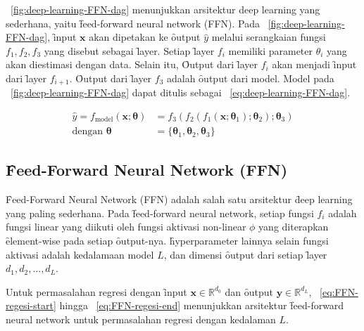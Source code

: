     \pic~\ref{fig:deep-learning-FFN-dag} menunjukkan arsitektur deep learning yang sederhana, yaitu \f{feed-forward neural network} (FFN). Pada \pic~\ref{fig:deep-learning-FFN-dag}, \f{input} $\mathbf{x}$ akan dipetakan ke \f{output} $\hat y$ melalui serangkaian fungsi $f_1, f_2, f_3$ yang disebut sebagai \f{layer}. Setiap \f{layer} $f_i$ memiliki parameter $\theta_i$ yang akan diestimasi dengan data. Selain itu, \f{Output} dari \f{layer} $f_i$ akan menjadi \f{input} dari \f{layer} $f_{i+1}$. \f{Output} dari \f{layer} $f_3$ adalah \f{output} dari model. Model pada \pic~\ref{fig:deep-learning-FFN-dag} dapat ditulis sebagai \equ~\ref{eq:deep-learning-FFN-dag}.

    \begin{align}
        \label{eq:deep-learning-FFN-dag}
        \hat y = f_{\text{model}}(\mathbf{x}; \bm{\theta}) &= f_3(f_2(f_1(\mathbf{x}; \bm{\theta}_1); \bm{\theta}_2); \bm{\theta}_3) \\
        \label{eq:deep-learning-FFN-dag-end}
        \text{dengan } \bm{\theta} &= \{\bm{\theta}_1, \bm{\theta}_2, \bm{\theta}_3\}
    \end{align}

    \subsection{\f{Feed-Forward Neural Network} (FFN)}

    \f{Feed-Forward Neural Network} (FFN) adalah salah satu arsitektur \f{deep learning} yang paling sederhana. Pada \f{feed-forward neural network}, setiap fungsi $f_i$ adalah fungsi linear yang diikuti oleh fungsi aktivasi non-linear $\phi$  yang diterapkan \f{element-wise} pada setiap \f{output}-nya. \f{hyperparameter} lainnya selain fungsi aktivasi adalah kedalamaan model $L$, dan dimensi \f{output} dari setiap \f{layer} $d_1, d_2, \dots, d_L$.

    Untuk permasalahan regresi dengan \f{input} $\mathbf{x}\in \mathbb{R}^{d_0}$ dan \f{output} $\mathbf{y} \in \mathbb{R}^{d_L}$, \equ~\ref{eq:FFN-regesi-start} hingga \equ~\ref{eq:FFN-regesi-end} menunjukkan arsitektur \f{feed-forward neural network} untuk permasalahan regresi dengan kedalaman $L$.


